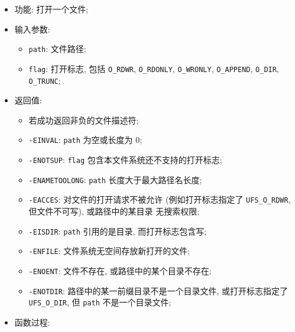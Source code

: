 \documentclass[nofonts]{ctexart}
\begin{document}
  \begin{itemize}
\item
  功能: 打开一个文件;
\item
  输入参数:

  \begin{itemize}
  \item
    \texttt{path}: 文件路径;
  \item
    \texttt{flag}: 打开标志, 包括 \texttt{O\_RDWR}, \texttt{O\_RDONLY},
    \texttt{O\_WRONLY}, \texttt{O\_APPEND}, \texttt{O\_DIR},
    \texttt{O\_TRUNC};
  \end{itemize}
\item
  返回值:

  \begin{itemize}
  \item
    若成功返回非负的文件描述符;
  \item
    \texttt{-EINVAL}: \texttt{path} 为空或长度为 0;
  \item
    \texttt{-ENOTSUP}: \texttt{flag} 包含本文件系统还不支持的打开标志;
  \item
    \texttt{-ENAMETOOLONG}: \texttt{path} 长度大于最大路径名长度;
  \item
    \texttt{-EACCES}: 对文件的打开请求不被允许 (例如打开标志指定了
    \texttt{UFS\_O\_RDWR}, 但文件不可写), 或路径中的某目录 无搜索权限;
  \item
    \texttt{-EISDIR}: \texttt{path} 引用的是目录, 而打开标志包含写;
  \item
    \texttt{-ENFILE}: 文件系统无空间存放新打开的文件;
  \item
    \texttt{-ENOENT}: 文件不存在, 或路径中的某个目录不存在;
  \item
    \texttt{-ENOTDIR}: 路径中的某一前缀目录不是一个目录文件,
    或打开标志指定了 \texttt{UFS\_O\_DIR}, 但 \texttt{path}
    不是一个目录文件;
  \end{itemize}
\item
  函数过程:


\end{itemize}
\end{document}
